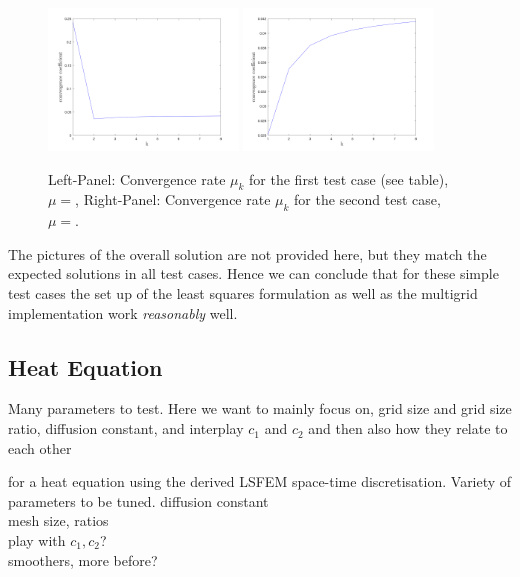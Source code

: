 \documentclass[../draft_1.tex]{subfiles}
\begin{document}
\begin{figure}[h!]
	\centering
	\includegraphics[width=0.45\textwidth]{images/implementation/poisson/test_case_1_conv_plot}
	\includegraphics[width=0.45\textwidth]{images/implementation/poisson/test_case_2_conv_plot}
	\caption{Left-Panel: Convergence rate $\mu_k$ for the first test case (see table), $\mu = $, Right-Panel: Convergence rate $\mu_k$ for the second test case, $\mu = $.}
\end{figure}
The pictures of the overall solution are not provided here, but they match the expected solutions in all test cases. Hence we can conclude that for these simple test cases the set up of the least squares formulation as well as the multigrid implementation work \textit{reasonably} well.

\FloatBarrier
\subsection{Heat Equation}

Many parameters to test. Here we want to mainly focus on, grid size and grid size ratio, diffusion constant, and interplay $c_1$ and $c_2$ and then also how they relate to each other

 for a heat equation using the derived LSFEM space-time discretisation.
 Variety of parameters to be tuned. 
 diffusion constant \\
 mesh size, ratios \\

  play with $c_1, c_2$? \\
  smoothers, more before? \\
\end{document}
